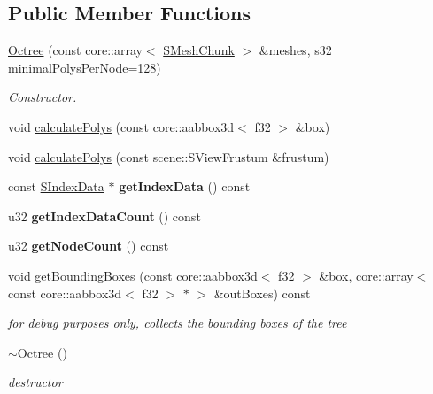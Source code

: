 \subsection*{Public Member Functions}
\begin{DoxyCompactItemize}
\item 
\hypertarget{classirr_1_1_octree_aaa98342567a0daa3c373475c0693d48c}{\hyperlink{classirr_1_1_octree_aaa98342567a0daa3c373475c0693d48c}{Octree} (const core\-::array$<$ \hyperlink{structirr_1_1_octree_1_1_s_mesh_chunk}{S\-Mesh\-Chunk} $>$ \&meshes, s32 minimal\-Polys\-Per\-Node=128)}\label{classirr_1_1_octree_aaa98342567a0daa3c373475c0693d48c}

\begin{DoxyCompactList}\small\item\em Constructor. \end{DoxyCompactList}\item 
void \hyperlink{classirr_1_1_octree_a5c7b4841d8f6c3fd0259f23ac730ebe5}{calculate\-Polys} (const core\-::aabbox3d$<$ f32 $>$ \&box)
\item 
void \hyperlink{classirr_1_1_octree_a0813b6219c4e7b679b756e5b2297d913}{calculate\-Polys} (const scene\-::\-S\-View\-Frustum \&frustum)
\item 
\hypertarget{classirr_1_1_octree_a3daae7fd62c1a0ce5500fb247cc27dc1}{const \hyperlink{structirr_1_1_octree_1_1_s_index_data}{S\-Index\-Data} $\ast$ {\bfseries get\-Index\-Data} () const }\label{classirr_1_1_octree_a3daae7fd62c1a0ce5500fb247cc27dc1}

\item 
\hypertarget{classirr_1_1_octree_a980a532862bf6b4349d8517addc1c5d1}{u32 {\bfseries get\-Index\-Data\-Count} () const }\label{classirr_1_1_octree_a980a532862bf6b4349d8517addc1c5d1}

\item 
\hypertarget{classirr_1_1_octree_af8480375f9e652f0d38e352377e38b74}{u32 {\bfseries get\-Node\-Count} () const }\label{classirr_1_1_octree_af8480375f9e652f0d38e352377e38b74}

\item 
\hypertarget{classirr_1_1_octree_a98b3043c418c19143cc1fddb05472b9f}{void \hyperlink{classirr_1_1_octree_a98b3043c418c19143cc1fddb05472b9f}{get\-Bounding\-Boxes} (const core\-::aabbox3d$<$ f32 $>$ \&box, core\-::array$<$ const core\-::aabbox3d$<$ f32 $>$ $\ast$ $>$ \&out\-Boxes) const }\label{classirr_1_1_octree_a98b3043c418c19143cc1fddb05472b9f}

\begin{DoxyCompactList}\small\item\em for debug purposes only, collects the bounding boxes of the tree \end{DoxyCompactList}\item 
\hypertarget{classirr_1_1_octree_a73dc7bee916ee459724e6e6d18cbffc1}{\hyperlink{classirr_1_1_octree_a73dc7bee916ee459724e6e6d18cbffc1}{$\sim$\-Octree} ()}\label{classirr_1_1_octree_a73dc7bee916ee459724e6e6d18cbffc1}

\begin{DoxyCompactList}\small\item\em destructor \end{DoxyCompactList}\end{DoxyCompactItemize}


